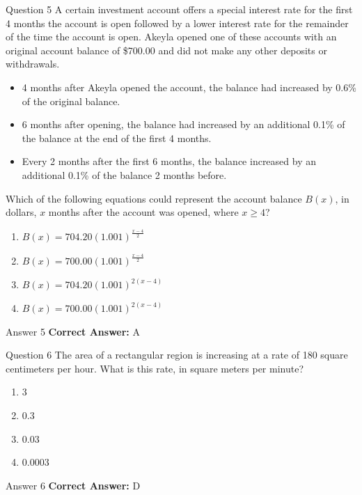 \documentclass{beamer}
\begin{document}
\begin{frame}{Question 5}
\small
A certain investment account offers a special interest rate for the first 4 months the account is open followed by a lower interest rate for the remainder of the time the account is open.
Akeyla opened one of these accounts with an original account balance of \$700.00 and did not make any other deposits or withdrawals.

\begin{itemize}
\item 4 months after Akeyla opened the account, the balance had increased by 0.6\% of the original balance.
\item 6 months after opening, the balance had increased by an additional 0.1\% of the balance at the end of the first 4 months.
\item Every 2 months after the first 6 months, the balance increased by an additional 0.1\% of the balance 2 months before.
\end{itemize}

Which of the following equations could represent the account balance \(B(x)\), in dollars, \(x\) months after the account was opened, where \(x \geq 4\)?
\vspace{0.35cm}
\begin{enumerate}
    \item[A.] \(B(x) = 704.20(1.001)^{\frac{x - 4}{2}}\)
    \item[B.] \(B(x) = 700.00(1.001)^{\frac{x - 4}{2}}\)
    \item[C.] \(B(x) = 704.20(1.001)^{2(x - 4)}\)
    \item[D.] \(B(x) = 700.00(1.001)^{2(x - 4)}\)
\end{enumerate}
\end{frame}
\begin{frame}{Answer 5}
\small
\textbf{Correct Answer:} A
\end{frame}

\begin{frame}{Question 6}
\small
The area of a rectangular region is increasing at a rate of 180 square centimeters per hour.
What is this rate, in square meters per minute?
\vspace{0.35cm}
\begin{enumerate}
    \item[A.] 3
    \item[B.] 0.3
    \item[C.] 0.03
    \item[D.] 0.0003
\end{enumerate}
\end{frame}
\begin{frame}{Answer 6}
\small
\textbf{Correct Answer:} D
\end{frame}
\end{document}
